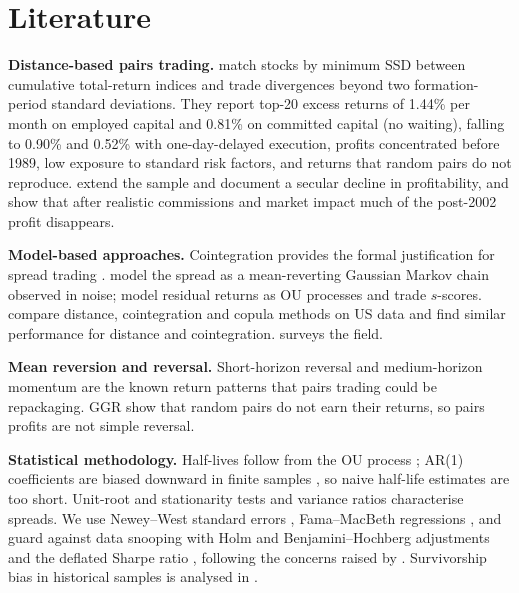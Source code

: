 \documentclass[11pt]{article}
\begin{document}
\section{Literature}

\textbf{Distance-based pairs trading.} \citet{gatev2006} match stocks by minimum SSD between cumulative total-return indices and trade divergences beyond two formation-period standard deviations. They report top-20 excess returns of 1.44\% per month on employed capital and 0.81\% on committed capital (no waiting), falling to 0.90\% and 0.52\% with one-day-delayed execution, profits concentrated before 1989, low exposure to standard risk factors, and returns that random pairs do not reproduce. \citet{dofaff2010} extend the sample and document a secular decline in profitability, and \citet{dofaff2012} show that after realistic commissions and market impact much of the post-2002 profit disappears.

\textbf{Model-based approaches.} Cointegration \citep{englegranger1987,johansen1991} provides the formal justification for spread trading \citep{vidyamurthy2004}. \citet{elliott2005} model the spread as a mean-reverting Gaussian Markov chain observed in noise; \citet{avellaneda2010} model residual returns as OU processes and trade $s$-scores. \citet{rad2016} compare distance, cointegration and copula methods on US data and find similar performance for distance and cointegration. \citet{krauss2017} surveys the field.

\textbf{Mean reversion and reversal.} Short-horizon reversal \citep{jegadeesh1990,lehmann1990} and medium-horizon momentum \citep{jegadeeshtitman1993} are the known return patterns that pairs trading could be repackaging. GGR show that random pairs do not earn their returns, so pairs profits are not simple reversal.

\textbf{Statistical methodology.} Half-lives follow from the OU process \citep{uhlenbeck1930}; AR(1) coefficients are biased downward in finite samples \citep{kendall1954}, so naive half-life estimates are too short. Unit-root and stationarity tests \citep{dickeyfuller1979,kpss1992} and variance ratios \citep{lomackinlay1988} characterise spreads. We use Newey--West standard errors \citep{neweywest1987}, Fama--MacBeth regressions \citep{famamacbeth1973}, and guard against data snooping with Holm and Benjamini--Hochberg adjustments \citep{holm1979,bh1995} and the deflated Sharpe ratio \citep{bailey2014}, following the concerns raised by \citet{harvey2016}. Survivorship bias in historical samples is analysed in \citet{brown1992}.
\end{document}
